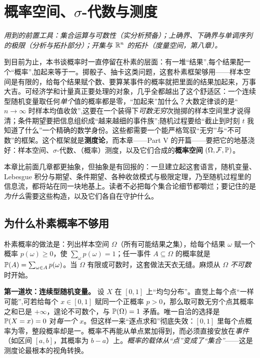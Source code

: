 \chapter{概率空间、$\sigma$-代数与测度}
\label{ch:measure}

\noindent\emph{用到的前置工具：集合运算与可数性（实分析预备）；上确界、下确界与单调序列的极限（分析与拓扑部分）；开集与 $\mathbb{R}^n$ 的拓扑（度量空间，第八章）。}
\medskip

到目前为止，本书谈概率时一直停留在朴素的层面：有一堆``结果'',每个结果配一个``概率'',加起来等于一。掷骰子、抽卡这类问题，这套朴素框架够用——样本空间是有限的，给每个结果赋个数、要算某事件的概率就把里面的结果加起来，万事大吉。可经济学和计量真正要处理的对象，几乎全都越出了这个舒适区：一个连续型随机变量取任何\emph{单个}值的概率都是零，``加起来''加什么？大数定律谈的是``$n\to\infty$ 时样本均值收敛'',这要在一个装得下\emph{可数无穷}次抛掷的样本空间里才说得清；条件期望要把信息组织成``越来越细的事件族'';随机过程要给``截止到时刻 $t$ 我知道了什么''一个精确的数学身份。这些都需要一个能严格驾驭``无穷''与``不可数''的框架。这个框架就是\textbf{测度论}，而本章——Part V 的开篇——要把它的地基浇好：样本空间、$\sigma$-代数、（概率）测度，以及它们合成的\textbf{概率空间} $(\Omega,\mathcal{F},\mathbb{P})$。

本章比前面几章都更抽象，但抽象是有回报的：一旦建立起这套语言，随机变量、Lebesgue 积分与期望、条件期望、各种收敛模式与极限定理，乃至随机过程里的信息流，都将站在同一块地基上。读者不必把每个集合论细节都嚼烂；要记住的是\emph{为什么}需要这些构造，以及它们各自在守护什么。

\section{为什么朴素概率不够用}
\label{sec:measure-motivation}

朴素概率的做法是：列出样本空间 $\Omega$（所有可能结果之集），给每个结果 $\omega$ 赋一个概率 $p(\omega)\ge 0$，使 $\sum_{\omega}p(\omega)=1$；任一事件 $A\subseteq\Omega$ 的概率就是 $\mathbb{P}\!\left(A\right)=\sum_{\omega\in A}p(\omega)$。当 $\Omega$ 有限或可数时，这套做法天衣无缝。麻烦从 $\Omega$ \emph{不可数}时开始。

\textbf{第一道坎：连续型随机变量。} 设 $X$ 在 $[0,1]$ 上``均匀分布''。直觉上每个点``一样可能'',可若给每个 $x\in[0,1]$ 赋同一个正概率 $p>0$，那么取可数无穷个点其概率之和已是 $+\infty$，遑论不可数个，与 $\mathbb{P}\!\left(\Omega\right)=1$ 矛盾。唯一自洽的选择是 $\mathbb{P}\!\left(X=x\right)=0$ 对\emph{每一个} $x$。但这样一来``逐点求和''彻底失效：$[0,1]$ 里每个点概率为零，整段概率却是一。概率不再能从单点累加得到，而必须直接安放在\emph{事件}（如区间 $[a,b]$，其概率为 $b-a$）上。\emph{概率的载体从``点''变成了``集合''}——这是测度论最根本的视角转换。

